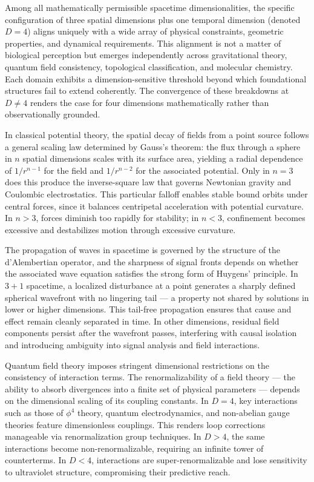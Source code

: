 
Among all mathematically permissible spacetime dimensionalities, the specific configuration of three spatial dimensions plus one temporal dimension (denoted $D=4$) aligns uniquely with a wide array of physical constraints, geometric properties, and dynamical requirements. This alignment is not a matter of biological perception but emerges independently across gravitational theory, quantum field consistency, topological classification, and molecular chemistry. Each domain exhibits a dimension-sensitive threshold beyond which foundational structures fail to extend coherently. The convergence of these breakdowns at $D \ne 4$ renders the case for four dimensions mathematically rather than observationally grounded.

In classical potential theory, the spatial decay of fields from a point source follows a general scaling law determined by Gauss’s theorem: the flux through a sphere in $n$ spatial dimensions scales with its surface area, yielding a radial dependence of $1/r^{n-1}$ for the field and $1/r^{n-2}$ for the associated potential. Only in $n=3$ does this produce the inverse-square law that governs Newtonian gravity and Coulombic electrostatics. This particular falloff enables stable bound orbits under central forces, since it balances centripetal acceleration with potential curvature. In $n>3$, forces diminish too rapidly for stability; in $n<3$, confinement becomes excessive and destabilizes motion through excessive curvature.

The propagation of waves in spacetime is governed by the structure of the d'Alembertian operator, and the sharpness of signal fronts depends on whether the associated wave equation satisfies the strong form of Huygens’ principle. In $3+1$ spacetime, a localized disturbance at a point generates a sharply defined spherical wavefront with no lingering tail — a property not shared by solutions in lower or higher dimensions. This tail-free propagation ensures that cause and effect remain cleanly separated in time. In other dimensions, residual field components persist after the wavefront passes, interfering with causal isolation and introducing ambiguity into signal analysis and field interactions.

Quantum field theory imposes stringent dimensional restrictions on the consistency of interaction terms. The renormalizability of a field theory — the ability to absorb divergences into a finite set of physical parameters — depends on the dimensional scaling of its coupling constants. In $D=4$, key interactions such as those of $\phi^4$ theory, quantum electrodynamics, and non-abelian gauge theories feature dimensionless couplings. This renders loop corrections manageable via renormalization group techniques. In $D>4$, the same interactions become non-renormalizable, requiring an infinite tower of counterterms. In $D<4$, interactions are super-renormalizable and lose sensitivity to ultraviolet structure, compromising their predictive reach.

